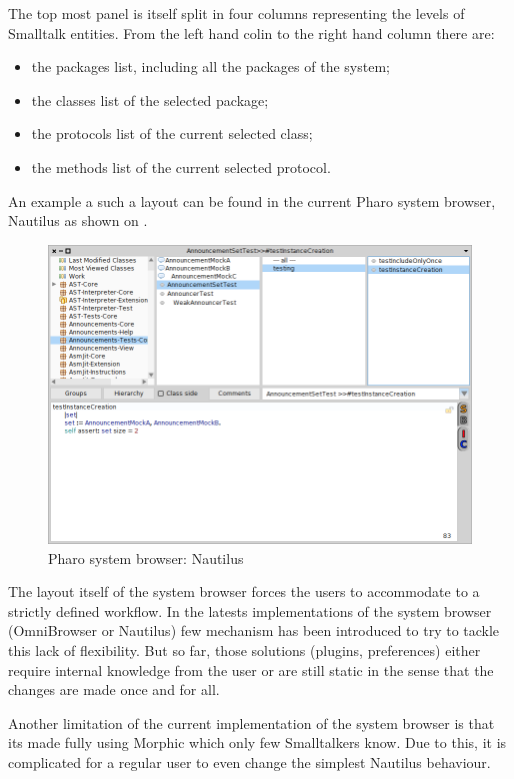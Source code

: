 \documentclass[12pt]{article}
\begin{document}
The top most panel is itself split in four columns representing the levels of Smalltalk entities.
From the left hand colin to the right hand column there are:
\begin{itemize}
	\item the packages list, including all the packages of the system;
	\item the classes list of the selected package;
	\item the protocols list of the current selected class;
	\item the methods list of the current selected protocol.
\end{itemize}

An example a such a layout can be found in the current Pharo system browser, Nautilus as shown on .
\begin{figure}[ht]
\begin{center}
     \includegraphics[width=15cm]{figures/Nautilus.png}
\end{center}
     \caption{Pharo system browser: Nautilus}
\end{figure}

The layout itself of the system browser forces the users to accommodate to a strictly defined workflow.
In the latests implementations of the system browser (OmniBrowser or Nautilus) few mechanism has been introduced to try to tackle this lack of flexibility.
But so far, those solutions (plugins, preferences) either require internal knowledge from the user or are still static in the sense that the changes are made once and for all.

Another limitation of the current implementation of the system browser is that its made fully using Morphic which only few Smalltalkers know.
Due to this, it is complicated for a regular user to even change the simplest Nautilus behaviour.
\end{document}
